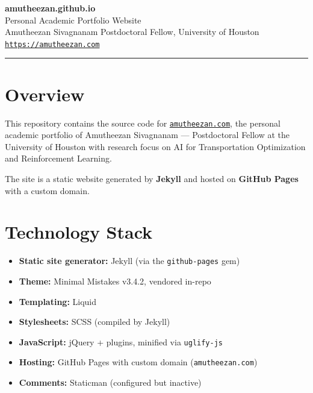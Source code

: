 \documentclass[11pt, a4paper]{article}
\begin{document}
\begin{center}
    {\LARGE\bfseries\color{accent} amutheezan.github.io}\\[4pt]
    {\large Personal Academic Portfolio Website}\\[6pt]
    {\normalsize
        Amutheezan Sivagnanam \quad\textbullet\quad
        Postdoctoral Fellow, University of Houston\\[2pt]
        \href{https://amutheezan.com}{\texttt{https://amutheezan.com}}
    }
\end{center}

\vspace{0.5em}
\hrule
\vspace{1em}

\section{Overview}

This repository contains the source code for
\href{https://amutheezan.com}{\texttt{amutheezan.com}}, the personal academic
portfolio of Amutheezan Sivagnanam --- Postdoctoral Fellow at the University of
Houston with research focus on AI for Transportation Optimization and
Reinforcement Learning.

The site is a static website generated by \textbf{Jekyll} and hosted on
\textbf{GitHub Pages} with a custom domain.

\section{Technology Stack}

\begin{itemize}[leftmargin=1.5em, itemsep=2pt]
    \item \textbf{Static site generator:} Jekyll (via the \texttt{github-pages} gem)
    \item \textbf{Theme:} Minimal Mistakes v3.4.2, vendored in-repo
    \item \textbf{Templating:} Liquid
    \item \textbf{Stylesheets:} SCSS (compiled by Jekyll)
    \item \textbf{JavaScript:} jQuery + plugins, minified via \texttt{uglify-js}
    \item \textbf{Hosting:} GitHub Pages with custom domain (\texttt{amutheezan.com})
    \item \textbf{Comments:} Staticman (configured but inactive)
\end{itemize}
\end{document}
